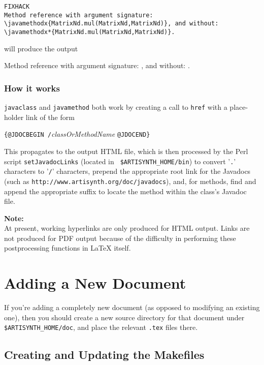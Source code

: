 \documentclass{article}
\begin{document}
\begin{lstlisting}FIXHACK
Method reference with argument signature:
\javamethodx{MatrixNd.mul(MatrixNd,MatrixNd)}, and without:
\javamethodx*{MatrixNd.mul(MatrixNd,MatrixNd)}.
\end{lstlisting}

will produce the output

Method reference with argument signature:
, and without:
.

\subsubsection{How it works}

{\tt \BKS javaclass} and {\tt \BKS javamethod} both work by creating a call
to {\tt \BKS href} with a place-holder link of the form

 {\tt \{@JDOCBEGIN /}{\it classOrMethodName} {\tt @JDOCEND\}}

This propagates to the output HTML file, which is then processed by
the Perl script {\tt setJavadocLinks} (located in {\tt
\$ARTISYNTH\_HOME/bin}) to convert '{\tt .}' characters to '{\tt /}'
characters, prepend the appropriate root link for the Javadocs (such
as {\tt http://www.\-artisynth.org/doc/javadocs}), and, for methods,
find and append the appropriate suffix to locate the method within the
class's Javadoc file.

\begin{sideblock}
{\bf Note:}\\
At present, working hyperlinks are only produced for HTML output.
Links are not produced for PDF output because of the difficulty
in performing these postprocessing functions in LaTeX itself.
\end{sideblock}

\section{Adding a New Document}

If you're adding a completely new document (as opposed
to modifying an existing one), then you should create a
new source directory for that document under {\tt \$ARTISYNTH\_HOME/doc},
and place the relevant {\tt .tex} files there.

\subsection{Creating and Updating the Makefiles}
\end{document}
